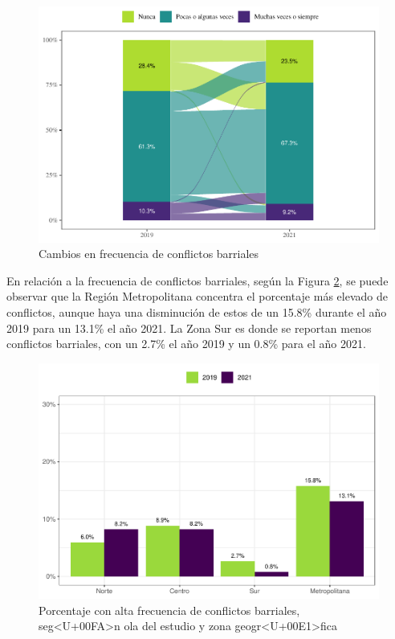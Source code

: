 \documentclass[
  12pt,
]{book}
\begin{document}
\begin{figure}

{\centering \includegraphics{reporte-elsoc_files/figure-latex/confli-cambio-1} 

}

\caption{Cambios en frecuencia de conflictos barriales}\label{fig:confli-cambio}
\end{figure}

En relación a la frecuencia de conflictos barriales, según la Figura \ref{fig:confli-zona}, se puede observar que la Región Metropolitana concentra el porcentaje más elevado de conflictos, aunque haya una disminución de estos de un 15.8\% durante el año 2019 para un 13.1\% el año 2021. La Zona Sur es donde se reportan menos conflictos barriales, con un 2.7\% el año 2019 y un 0.8\% para el año 2021.

\begin{figure}

{\centering \includegraphics{reporte-elsoc_files/figure-latex/confli-zona-1} 

}

\caption{Porcentaje con alta frecuencia de conflictos barriales, seg<U+00FA>n ola del estudio y zona geogr<U+00E1>fica}\label{fig:confli-zona}
\end{figure}
\end{document}
